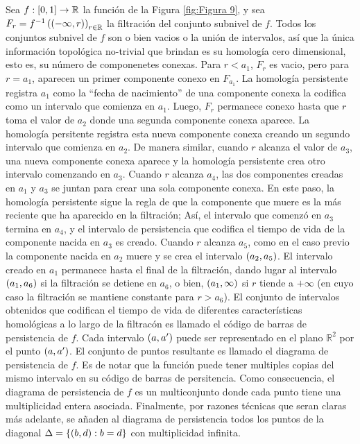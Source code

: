 Sea $f:\left[0,1\right]\rightarrow\mathbb{R}$ la funci\'on de la Figura \ref{fig:Figura 9},
y sea $F_{r} = f^{-1}\left(\left(-\infty,r\right)\right)_{r\in\mathbb{R}}$ la filtraci\'on del conjunto subnivel de $f$.
Todos los conjuntos subnivel de $f$ son o bien vacios o la uni\'on de intervalos,
as\'i que la \'unica informaci\'on topol\'ogica no-trivial que brindan es su homolog\'ia cero dimensional, esto es, su n\'umero de componenetes conexas.
Para $r<a_{1}$, $F_{r}$ es vacio, pero para $r = a_{1}$, aparecen un primer componente conexo en $F_{a_{1}}$.
La homolog\'ia persistente registra $a_{1}$ como la ``fecha de nacimiento'' de una componente conexa la codifica como un intervalo que comienza en $a_{1}$.
Luego, $F_{r}$ permanece conexo hasta que $r$ toma el valor de $a_{2}$ donde una segunda componente conexa aparece.
La homolog\'ia persitente registra esta nueva componente conexa creando un segundo intervalo que comienza en $a_{2}$.
De manera similar, cuando $r$ alcanza el valor de $a_{3}$, una nueva componente conexa aparece y la homolog\'ia persistente crea otro intervalo comenzando en $a_{3}$.
Cuando $r$ alcanza $a_{4}$, las dos componentes creadas en $a_{1}$ y $a_{3}$ se juntan para crear una sola componente conexa.
En este paso, la homolog\'ia persistente sigue la regla de que la componente que muere es la m\'as reciente que ha aparecido en la filtraci\'on;
As\'i, el intervalo que comenz\'o en $a_{3}$ termina en $a_{4}$,
y el intervalo de persistencia que codifica el tiempo de vida de la componente nacida en $a_{3}$ es creado.
Cuando $r$ alcanza $a_{5}$, como en el caso previo la componente nacida en $a_{2}$ muere y se crea el intervalo $\left(a_{2},a_{5}\right)$.
El intervalo creado en $a_{1}$ permanece hasta el final de la filtraci\'on,
dando lugar al intervalo $\left(a_{1},a_{6}\right)$ si la filtraci\'on se detiene en $a_{6}$,
o bien, $\left(a_{1},\infty\right)$ si $r$ tiende a $+\infty$ (en cuyo caso la filtraci\'on se mantiene constante para $r>a_{6}$).
El conjunto de intervalos obtenidos que codifican el tiempo de vida de diferentes caracter\'isticas homol\'ogicas a lo largo de la filtrac\'on es llamado el c\'odigo de barras de persistencia de $f$.
Cada intervalo $\left(a,a'\right)$ puede ser representado en el plano $\mathbb{R}^{2}$ por el punto $\left(a,a'\right)$.
El conjunto de puntos resultante es llamado el diagrama de persistencia de $f$.
Es de notar que la funci\'on puede tener multiples copias del mismo intervalo en su c\'odigo de barras de persitencia.
Como consecuencia, el diagrama de persistencia de $f$ es un multiconjunto donde cada punto tiene una multiplicidad entera asociada.
Finalmente, por razones t\'ecnicas que seran claras m\'as adelante,
se a\~{n}aden al diagrama de persistencia todos los puntos de la diagonal $\Delta = \left\{\left(b,d\right): b=d\right\}$ con multiplicidad infinita.

